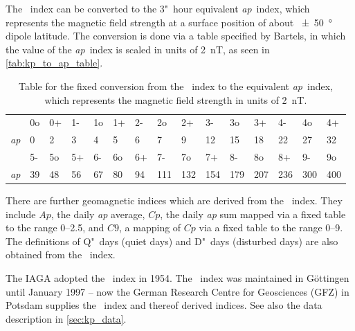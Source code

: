 The \Kp{}~index can be converted to the 3"~hour equivalent \textit{ap}~index, which represents the magnetic field strength at a surface position of about \SI{+-50}{\degree} dipole latitude. The conversion is done via a table specified by Bartels, in which the value of the \textit{ap}~index is scaled in units of \SI{2}{nT}, as seen in \autoref{tab:kp_to_ap_table}.
\begin{table}[h!]
	\caption{Table for the fixed conversion from the \Kp~index to the equivalent \textit{ap}~index, which represents the magnetic field strength in units of \SI{2}{nT}.}
	\label{tab:kp_to_ap_table}
	\centering
	\begin{tabular}{lssssssssssssss}
		\Kp	&0o	&0+	&1-	&1o	&1+	&2-	&2o	&2+	&3-	&3o	&3+	&4-	&4o	&4+\\
		\textit{ap}	&0	&2	&3	&4	&5	&6	&7	&9	&12	&15	&18	&22	&27	&32\\
		\hline
		\Kp	&5-	&5o	&5+	&6-	&6o	&6+	&7-	&7o	&7+	&8-	&8o	&8+	&9-	&9o\\
		\textit{ap}	&39	&48	&56	&67	&80	&94	&111	&132	&154	&179	&207	&236	&300	&400
	\end{tabular}
\end{table}
\pagebreak
There are further geomagnetic indices which are derived from the \Kp{}~index. They include $Ap$, the daily \textit{ap} average, $Cp$, the daily \textit{ap} sum mapped via a fixed table to the range \numrange{0}{2.5}, and $C9$, a mapping of $Cp$ via a fixed table to the range \numrange{0}{9}. The definitions of Q"~days (quiet days) and D"~days (disturbed days) are also obtained from the \Kp{}~index.

The IAGA adopted the \Kp{}~index in 1954. The \Kp{}~index was maintained in Göttingen until January 1997 -- now the German Research Centre for Geosciences (GFZ) in Potsdam supplies the \Kp{}~index and thereof derived indices. See also the \Kp{} data description in \autoref{sec:kp_data}.


